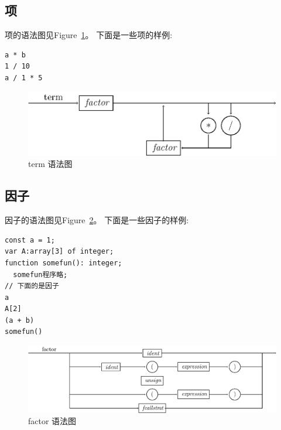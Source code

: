 \subsection{项}

项的语法图见Figure~\ref{term}。
下面是一些项的样例:
\begin{verbatim}
a * b
1 / 10
a / 1 * 5
\end{verbatim}
\begin{figure}[h!]
\begin{center}
    \includegraphics[scale=.8]{Figures/term.eps}
\end{center}
\caption{term 语法图}
\label{term}
\end{figure}
\subsection{因子}


因子的语法图见Figure~\ref{factor}。
下面是一些因子的样例:
\begin{verbatim}
const a = 1;
var A:array[3] of integer;
function somefun(): integer;
  somefun程序略;
// 下面的是因子
a 
A[2]
(a + b)
somefun()
\end{verbatim}
\begin{figure}[h!]
\begin{center}
    \includegraphics[scale=.8]{Figures/factor.eps}
\end{center}
\caption{factor 语法图}
\label{factor}
\end{figure}
